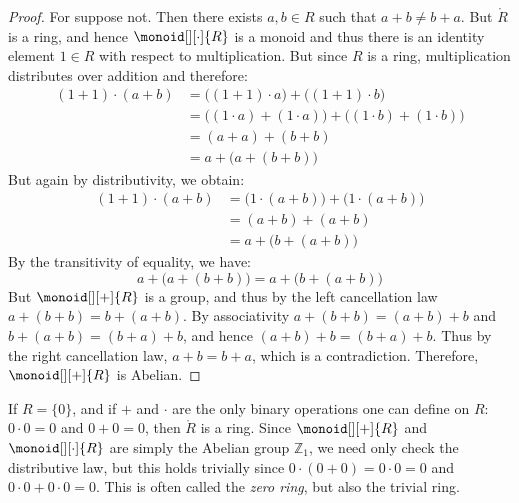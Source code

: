 \documentclass{article}                                                        %
\begin{document}
        \begin{proof}
            For suppose not. Then there exists $a,b\in{R}$ such that
            $a+b\ne{b}+a$. But $\ring{R}$ is a ring, and hence
            $\monoid[][\cdot]{R}$ is a monoid and thus there is an identity
            element $1\in{R}$ with respect to multiplication. But since $R$ is a
            ring, multiplication distributes over addition and therefore:
            \begin{align}
                (1+1)\cdot(a+b)
                    &=\big((1+1)\cdot{a}\big)+\big((1+1)\cdot{b}\big)
                    \tag{Left Distributive Law}\\
                    &=\big((1\cdot{a})+(1\cdot{a})\big)+
                        \big((1\cdot{b})+(1\cdot{b})\big)
                    \tag{Right Distributive Law}\\
                    &=(a+a)+(b+b)
                        \tag{Multiplicative Identity}\\
                    &=a+\big(a+(b+b)\big)
                        \tag{Associative Law}
            \end{align}
            But again by distributivity, we obtain:
            \begin{align}
                (1+1)\cdot(a+b)
                &=\big(1\cdot(a+b)\big)+\big(1\cdot(a+b)\big)
                \tag{Right Distributive Law}\\
                &=(a+b)+(a+b)
                    \tag{Multiplicative Identity}\\
                &=a+\big(b+(a+b)\big)
                    \tag{Associative Law}
            \end{align}
            By the transitivity of equality, we have:
            \begin{equation}
                a+\big(a+(b+b)\big)=a+\big(b+(a+b)\big)
            \end{equation}
            But $\monoid[][+]{R}$ is a group, and thus by the left cancellation
            law $a+(b+b)=b+(a+b)$. By associativity $a+(b+b)=(a+b)+b$ and
            $b+(a+b)=(b+a)+b$, and hence $(a+b)+b=(b+a)+b$. Thus by the right
            cancellation law, $a+b=b+a$, which is a contradiction. Therefore,
            $\monoid[][+]{R}$ is Abelian.
        \end{proof}
        \begin{example}
            If $R=\{0\}$, and if $+$ and $\cdot$ are the only binary operations
            one can define on $R$: $0\cdot{0}=0$ and $0+0=0$, then
            $\ring{R}$ is a ring. Since $\monoid[][+]{R}$ and
            $\monoid[][\cdot]{R}$ are simply the Abelian group $\mathbb{Z}_{1}$,
            we need only check the distributive law, but this holds trivially
            since $0\cdot(0+0)=0\cdot{0}=0$ and $0\cdot{0}+0\cdot{0}=0$. This is
            often called the \textit{zero ring}, but also the trivial ring.
        \end{example}
\end{document}
